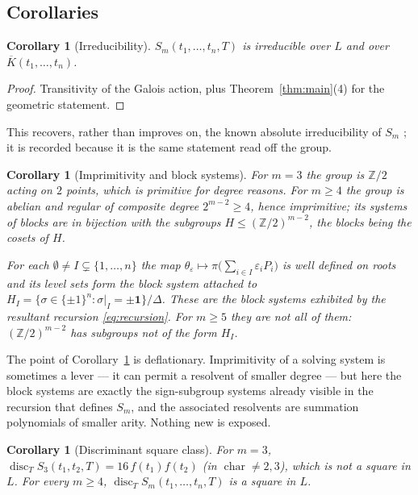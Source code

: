 \documentclass[11pt,a4paper]{article}
\theoremstyle{plain}
\newtheorem{corollary}[theorem]{Corollary}
\theoremstyle{definition}
\DeclareMathOperator{\disc}{disc}
\newcommand{\ZZ}{\mathbb{Z}}
\newcommand{\eps}{\varepsilon}
\begin{document}
\subsection{Corollaries}

\begin{corollary}[Irreducibility]\label{cor:irred}
$S_m(t_1,\dots,t_n,T)$ is irreducible over $L$ and over $\overline{K}(t_1,\dots,t_n)$.
\end{corollary}

\begin{proof}
Transitivity of the Galois action, plus Theorem~\ref{thm:main}(4) for the
geometric statement.
\end{proof}

This recovers, rather than improves on, the known absolute irreducibility of
$S_m$ \cite{semaev2004,gaudry2009}; it is recorded because it is the same
statement read off the group.

\begin{corollary}[Imprimitivity and block systems]\label{cor:blocks}
For $m = 3$ the group is $\ZZ/2$ acting on $2$ points, which is primitive for
degree reasons. For $m \ge 4$ the group is abelian and regular of composite
degree $2^{m-2} \ge 4$, hence \emph{imprimitive}; its systems of blocks are in
bijection with the subgroups $H \le (\ZZ/2)^{m-2}$, the blocks being the cosets
of $H$.

For each $\emptyset \neq I \subsetneq \{1,\dots,n\}$ the map
$\theta_{\eps} \mapsto \pi\bigl(\sum_{i \in I} \eps_i P_i\bigr)$ is well defined on
roots and its level sets form the block system attached to
$H_I = \{ \sigma \in \{\pm1\}^n : \sigma|_I = \pm \mathbf{1} \}/\Delta$. These are
the block systems exhibited by the resultant recursion \eqref{eq:recursion}. For
$m \ge 5$ they are not all of them: $(\ZZ/2)^{m-2}$ has subgroups not of the form
$H_I$.
\end{corollary}

The point of Corollary~\ref{cor:blocks} is deflationary. Imprimitivity of a
solving system is sometimes a lever --- it can permit a resolvent of smaller degree
--- but here the block systems are exactly the sign-subgroup systems already
visible in the recursion that defines $S_m$, and the associated resolvents are
summation polynomials of smaller arity. Nothing new is exposed.

\begin{corollary}[Discriminant square class]\label{cor:disc}
For $m = 3$, $\disc_T S_3(t_1,t_2,T) = 16\,f(t_1)f(t_2)$ (in
$\operatorname{char} \neq 2,3$), which is not a square in $L$. For every
$m \ge 4$, $\disc_T S_m(t_1,\dots,t_n,T)$ \emph{is} a square in $L$.
\end{corollary}
\end{document}
